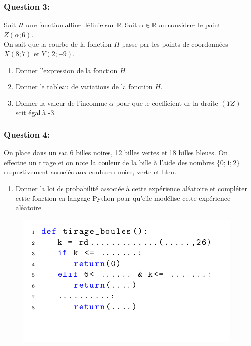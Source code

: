 \documentclass[t,12pt]{beamer}
\newcommand{\R}{\mathbb{R}}
\begin{document}
\begin{frame}
	\frametitle{Question 3: }
	Soit $H$ une fonction affine définie sur $\R$. Soit $\alpha\in\R$ on considère le point $Z\left(\alpha ;6\right)$.\hfill\\[0.2cm]
	On sait que la courbe de la fonction $H$ passe par les points de coordonnées $X(8;7)$ et $Y(2;-9)$. \hfill\\[0.3cm]
	\begin{enumerate}
		\item Donner l'expression de la fonction $H$.
		\item Donner le tableau de variations de la fonction $H$.
		\item Donner la valeur de l'inconnue $\alpha$ pour que le coefficient de la droite $\left(YZ\right)$ soit égal à -3. 
	\end{enumerate}
	
	
	
\end{frame}

\begin{frame}
	
	\frametitle{Question 4: }
	On place dans un sac 6 billes noires, 12 billes vertes et 18 billes bleues. On effectue un tirage et on note la couleur de la bille à l'aide des nombres $\{0 ; 1 ; 2\}$ respectivement associés aux couleurs: noire, verte et bleu. 
	\begin{enumerate}
		\item Donner la loi de probabilité associée à cette expérience aléatoire et compléter cette fonction en langage Python pour qu'elle modélise cette expérience aléatoire. 
	\end{enumerate}

	\begin{figure}
		\centering
		\includegraphics[scale=0.37]{2.png}
	\end{figure}


	
\end{frame}
\end{document}
